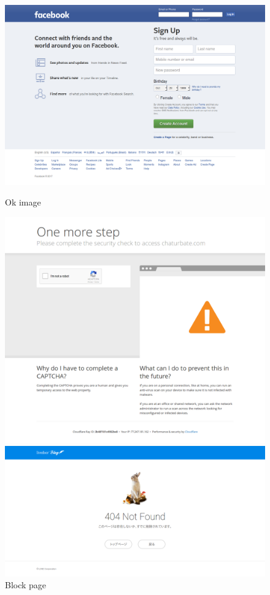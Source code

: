 \documentclass{article} %
\begin{document}
\begin{figure}[!htb]
  \includegraphics[width=\linewidth]{ok.png}
  \caption{Ok image}\label{fig:ok}
\endminipage\hfill
{}
  \includegraphics[width=\linewidth]{block.png}
  \caption{Block page}\label{fig:block}
\endminipage\hfill
{}%
  \includegraphics[width=\linewidth]{servererr.png}

\end{figure}
\end{document}
